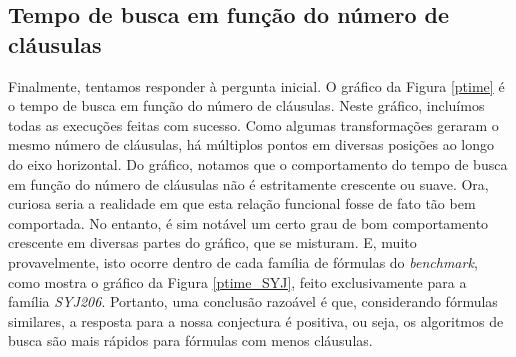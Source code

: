 \subsection{Tempo de busca em função do número de cláusulas}



\indent

Finalmente, tentamos responder à pergunta inicial. O gráfico da Figura \ref{ptime} é o tempo de busca em função do número de cláusulas. Neste gráfico, incluímos todas as execuções feitas com sucesso. Como algumas transformações geraram o mesmo número de cláusulas, há múltiplos pontos em diversas posições ao longo do eixo horizontal. Do gráfico, notamos que o comportamento do tempo de busca em função do número de cláusulas não é estritamente crescente ou suave. Ora, curiosa seria a realidade em que esta relação funcional fosse de fato tão bem comportada. No entanto, é sim notável um certo grau de bom comportamento crescente em diversas partes do gráfico, que se misturam. E, muito provavelmente, isto ocorre dentro de cada família de fórmulas do \emph{benchmark}, como mostra o gráfico da Figura \ref{ptime_SYJ}, feito exclusivamente para a família \emph{SYJ206}. Portanto, uma conclusão razoável é que, considerando fórmulas similares, a resposta para a nossa conjectura é positiva, ou seja, os algoritmos de busca são mais rápidos para fórmulas com menos cláusulas.
